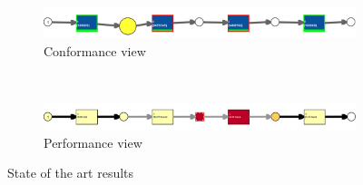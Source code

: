 \begin{figure}
    \centering
    \begin{subfigure}[t]{0.475\textwidth}
    \centering
    \includegraphics[scale=0.425,angle=90]{figures/evaluation/synth_std_conf.png}
    \caption{Conformance view}
    \label{fig:synthstdconf}
    \end{subfigure}
    ~
    \begin{subfigure}[t]{0.475\textwidth}
    \centering
    \includegraphics[scale=0.425,angle=90]{figures/evaluation/synth_std_perf_slim.png}
    \caption{Performance view}
    \label{fig:synthstdperf}
    \end{subfigure}
    \caption{State of the art results}
\end{figure}


